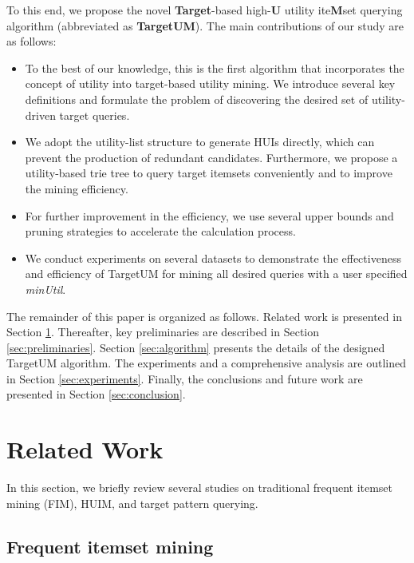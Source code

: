 \documentclass[journal]{IEEEtran}
\begin{document}
To this end, we propose the novel \textbf{Target}-based high-\textbf{U} utility ite\textbf{M}set querying algorithm (abbreviated as \textbf{TargetUM}). The main contributions of our study are as follows:

\begin{itemize}
	\item  To the best of our knowledge, this is the first algorithm that incorporates the concept of utility into target-based utility mining. We introduce several key definitions and formulate the problem of discovering the desired set of utility-driven target queries.
	
	\item  We adopt the utility-list structure to generate HUIs directly, which can prevent the production of redundant candidates. Furthermore, we propose a utility-based trie tree to query target itemsets conveniently and to improve the mining efficiency.
	
	\item  For further improvement in the efficiency, we use several upper bounds and pruning strategies to accelerate the calculation process.
	
	\item  We conduct experiments on several datasets to demonstrate the effectiveness and efficiency of TargetUM for mining all desired queries with a user specified \textit{minUtil}.
	
\end{itemize}


The remainder of this paper is organized as follows. Related work is presented in Section \ref{sec:relatedwork}. Thereafter, key preliminaries are described in Section \ref{sec:preliminaries}. Section \ref{sec:algorithm} presents the details of the designed TargetUM algorithm. The experiments and a comprehensive analysis are outlined in Section \ref{sec:experiments}. Finally, the conclusions and future work are presented in Section \ref{sec:conclusion}.


\section{Related Work}
\label{sec:relatedwork}

In this section, we briefly review several studies on traditional frequent itemset mining (FIM), HUIM, and target pattern querying.


\subsection{Frequent itemset mining}
\end{document}
